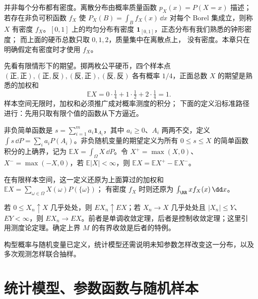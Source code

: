 并非每个分布都有密度。离散分布由概率质量函数
\(p_X(x)=P(X=x)\) 描述；若存在非负可积函数 \(f_X\) 使
\(P_X(B)=\int_Bf_X(x)\,\dd x\) 对每个 Borel 集成立，则称
\(X\) 有密度 \(f_X\)。\([0,1]\) 上的均匀分布有密度
\(\mathbf1_{[0,1]}\)，正态分布有我们熟悉的钟形密度；
而上面的硬币总数只取 \(0,1,2\)，质量集中在离散点上，
没有密度。本章只在明确假定有密度时才使用 \(f_X\)。

先看有限情形下的期望。掷两枚公平硬币，四个样本点
\((\text{正},\text{正}),(\text{正},\text{反}),
(\text{反},\text{正}),(\text{反},\text{反})\)
各有概率 \(1/4\)，正面总数 \(X\) 的期望是熟悉的加权和
\[
\mathbb EX=0\cdot\tfrac14+1\cdot\tfrac12+2\cdot\tfrac14=1.
\]
样本空间无限时，加权和必须推广成对概率测度的积分；
下面的定义沿标准路径进行：先用只取有限个值的函数从下方逼近。

\begin{definition}[期望]
非负简单函数是 \(s=\sum_{i=1}^m a_i\mathbf1_{A_i}\)，其中 \(a_i\ge0\)、\(A_i\) 两两不交，定义 \(\int s\,\dd P=\sum_i a_iP(A_i)\)。非负随机变量的期望定义为所有 \(0\le s\le X\) 的简单函数积分的上确界，记为 \(\mathbb E X=\int_\Omega X\,\dd P\)。令 \(X^+=\max(X,0)\)、\(X^-=\max(-X,0)\)，若 \(\mathbb E|X|<\infty\)，则 \(\mathbb E X=\mathbb E X^+-\mathbb E X^-\)。
\end{definition}

在有限样本空间，这一定义还原为上面算过的加权和
\(\mathbb E X=\sum_{\omega\in\Omega}X(\omega)P(\{\omega\})\)；
有密度 \(f_X\) 时则还原为 \(\int_{\RR}xf_X(x)\,\dd x\)。


\begin{theorem}[用于期望的两种极限交换]
若 $0\le X_n\uparrow X$ 几乎处处，则 $EX_n\uparrow EX$；若 $X_n\to X$ 几乎处处且 $|X_n|\le Y$、$EY<\infty$，则 $EX_n\to EX$。前者是单调收敛定理，后者是控制收敛定理；这里引用测度论定理。确定上界 $M$ 的有界收敛是后者的特例。
\end{theorem}
构型概率与随机变量已定义，统计模型还需说明未知参数怎样改变这一分布，以及多次观测怎样联合抽样。

\section{统计模型、参数函数与随机样本}




